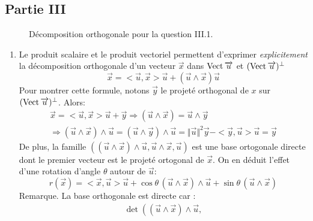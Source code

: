 \subsection*{Partie III}
\begin{figure}[ht]
 \centering
 
 \caption{Décomposition orthogonale pour la question III.1.}
\end{figure}
\begin{enumerate}
 \item Le produit scalaire et le produit vectoriel permettent d'exprimer \emph{explicitement} la décomposition orthogonale d'un vecteur $\overrightarrow x$ dans $\operatorname{Vect} \overrightarrow u$ et $(\operatorname{Vect} \overrightarrow u)^\perp$
\begin{displaymath}
 \overrightarrow x =
<\overrightarrow u , \overrightarrow x> \overrightarrow u +
(\overrightarrow u \wedge \overrightarrow x)\overrightarrow u 
\end{displaymath}
Pour montrer cette formule, notons $\overrightarrow y$ le projeté orthogonal de $x$ sur $(\operatorname{Vect} \overrightarrow u)^\perp$. Alors:
\begin{multline*}
\overrightarrow x =
<\overrightarrow u , \overrightarrow x> \overrightarrow u + \overrightarrow y
\Rightarrow (\overrightarrow u \wedge \overrightarrow x) = \overrightarrow u \wedge \overrightarrow y \\
 \Rightarrow
(\overrightarrow u \wedge \overrightarrow x)\wedge \overrightarrow u 
=
(\overrightarrow u \wedge \overrightarrow y)\wedge \overrightarrow u 
= \Vert \overrightarrow u \Vert^2 \overrightarrow y - <\overrightarrow y, \overrightarrow u> \overrightarrow u
=\overrightarrow y 
\end{multline*}
De plus, la famille 
$\left(
(\overrightarrow u \wedge \overrightarrow x)\wedge \overrightarrow u,
\overrightarrow u \wedge \overrightarrow x,
\overrightarrow u
 \right) $
est une base ortogonale directe dont le premier vecteur est le projeté ortogonal de $\overrightarrow x$. On en déduit l'effet d'une rotation d'angle $\theta$ autour de $\overrightarrow u$:
\begin{displaymath}
 r(\overrightarrow{x})
    =<\overrightarrow{x},\overrightarrow{u}> \overrightarrow{u}
     + \cos \theta \,(\overrightarrow{u}\wedge\overrightarrow{x})\wedge \overrightarrow{u}
     + \sin \theta \,(\overrightarrow{u}\wedge\overrightarrow{x})
\end{displaymath}
Remarque. La base orthogonale est directe car :
\begin{multline*}
 \det
\left( 
(\overrightarrow u \wedge \overrightarrow x)\wedge \overrightarrow u,

\end{multline*}
\end{enumerate}
